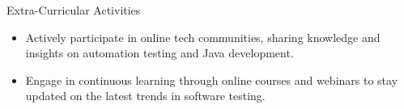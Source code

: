 \documentclass{resume} %
\begin{document}
\begin{rSection}{Extra-Curricular Activities} 
\begin{itemize}
    \item Actively participate in online tech communities, sharing knowledge and insights on automation testing and Java development.
    \item Engage in continuous learning through online courses and webinars to stay updated on the latest trends in software testing.
\end{itemize}


\end{rSection}
\end{document}

